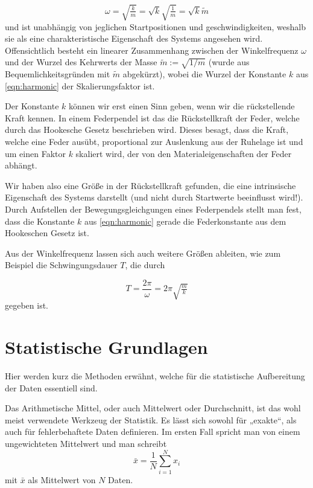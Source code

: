 \begin{equation}\label{eqn:omega}
	\omega = \sqrt{\tfrac{k}{m}} = \sqrt{k}\sqrt{\tfrac{1}{m}} = \sqrt{k}\tilde{m}
\end{equation}
und ist unabhängig von jeglichen Startpositionen und geschwindigkeiten, weshalb sie als eine charakteristische Eigenschaft des Systems angesehen wird. Offensichtlich besteht ein linearer Zusammenhang zwischen der Winkelfrequenz \( \omega \) und der Wurzel des Kehrwerts der Masse \( \tilde{m} := \sqrt{1/m} \) (wurde aus Bequemlichkeitsgründen mit \( \tilde{m} \) abgekürzt), wobei die Wurzel der Konstante \( k \) aus \autoref{eqn:harmonic} der Skalierungsfaktor ist. 

Der Konstante \( k \) können wir erst einen Sinn geben, wenn wir die rückstellende Kraft kennen. In einem Federpendel ist das die Rückstellkraft der Feder, welche durch das Hookesche Gesetz beschrieben wird. Dieses besagt, dass die Kraft, welche eine Feder ausübt, proportional zur Auslenkung aus der Ruhelage ist und um einen Faktor \( k \) skaliert wird, der von den Materialeigenschaften der Feder abhängt. 

Wir haben also eine Größe in der Rückstellkraft gefunden, die eine intrinsische Eigenschaft des Systems darstellt (und nicht durch Startwerte beeinflusst wird!). Durch Aufstellen der Bewegungsgleichgungen eines Federpendels stellt man fest, dass die Konstante \( k \) aus \autoref{eqn:harmonic} gerade die Federkonstante aus dem Hookeschen Gesetz ist.  


Aus der Winkelfrequenz lassen sich auch weitere Größen ableiten, wie zum Beispiel die Schwingungsdauer \( T \), die durch

\begin{equation}\label{eqn:T}
	T = \frac{2\pi}{\omega} = 2\pi \sqrt{\tfrac{m}{k}}
\end{equation}
gegeben ist.

\section{Statistische Grundlagen}

Hier werden kurz die Methoden erwähnt, welche für die statistische Aufbereitung der Daten essentiell sind.

Das Arithmetische Mittel, oder auch Mittelwert oder Durchschnitt, ist das wohl meist verwendete Werkzeug der Statistik. Es lässt sich sowohl  für „exakte“, als auch für fehlerbehaftete Daten definieren. Im ersten Fall spricht man von einem ungewichteten Mittelwert und man schreibt 
\begin{equation}\label{eqn:mean1}
	\bar{x} = \frac{1}{N} \sum_{i=1}^{N} x_i
\end{equation}
mit $\bar{x}$ als Mittelwert von \( N \) Daten. \cite[S. 10]{error}

